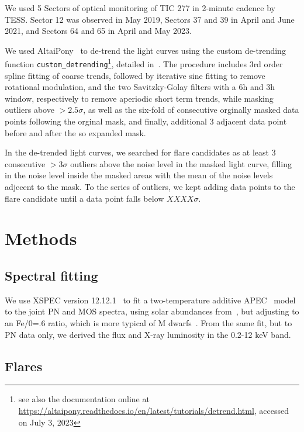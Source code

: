 \documentclass[twocolumn]{aastex631}
\begin{document}
We used 5 Sectors of optical monitoring of TIC 277 in 2-minute cadence by TESS. Sector 12 was observed in May 2019, Sectors 37 and 39 in April and June 2021, and Sectors 64 and 65 in April and May 2023. 

We used AltaiPony~\citep{ilin2021altaipony} to de-trend the light curves using the custom de-trending function \texttt{custom\_detrending}\footnote{see also the documentation online at \url{https://altaipony.readthedocs.io/en/latest/tutorials/detrend.html}, accessed on July 3, 2023}, detailed in~\citet{ilin2022searching}. The procedure includes 3rd order spline fitting of coarse trends, followed by iterative sine fitting to remove rotational modulation, and the two Savitzky-Golay filters with a 6h and 3h window, respectively to remove aperiodic short term trends, while masking outliers above $>2.5\sigma$, as well as the six-fold of consecutive orginally masked data points following the orginal mask, and finally, additional 3 adjacent data point before and after the so expanded mask. 

In the de-trended light curves, we searched for flare candidates as at least 3 consecutive $>3\sigma$ outliers above the noise level in the masked light curve, filling in the noise level inside the masked areas with the mean of the noise levels adjecent to the mask. To the series of outliers, we kept adding data points to the flare candidate until a data point falls below $XXXX\sigma$. 

\section{Methods}
\label{sec:methods}


\subsection{Spectral fitting}
We use XSPEC version 12.12.1~\citep{arnaud1996xspec} to fit a two-temperature additive APEC~\citep{smith2001collisional,foster2012updated} model to the joint PN and MOS spectra, using solar abundances from~\citet{grevesse1998standard}, but adjusting to an Fe/0=.6 ratio, which is more typical of M dwarfs~\citep{wood2018chandra}. From the same fit, but to PN data only, we derived the flux and X-ray luminosity in the 0.2-12 keV band. 



\subsection{Flares}
\end{document}
